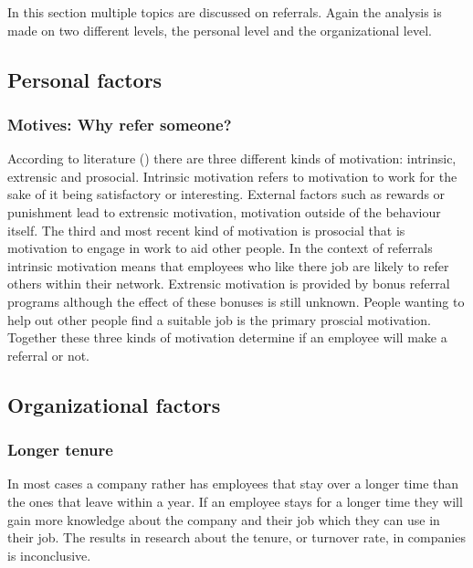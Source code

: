 \documentclass[Main.tex]{subfiles}
\begin{document}
In this section multiple topics are discussed on referrals. Again the analysis is made on two different levels, the personal level and the organizational level. 

\subsection*{Personal factors}

\subsubsection*{Motives: Why refer someone?}

According to literature (\cite{motives}) there are three different kinds of motivation: intrinsic, extrensic and prosocial. Intrinsic motivation refers to motivation to work for the sake of it being satisfactory or interesting. External factors such as rewards or punishment lead to extrensic motivation, motivation outside of the behaviour itself. The third and most recent kind of motivation is prosocial that is motivation to engage in work to aid other people. In the context of referrals intrinsic motivation means that employees who like there job are likely to refer others within their network. Extrensic motivation is provided by bonus referral programs although the effect of these bonuses is still unknown. People wanting to help out other people find a suitable job is the primary proscial motivation. Together these three kinds of motivation determine if an employee will make a referral or not.



\subsection*{Organizational factors}

\subsubsection*{Longer tenure}
In most cases a company rather has employees that stay over a longer time than the ones that leave within a year. If an employee stays for a longer time they will gain more knowledge about the company and their job which they can use in their job. 
The results in research about the tenure, or turnover rate, in companies is inconclusive.
\end{document}
